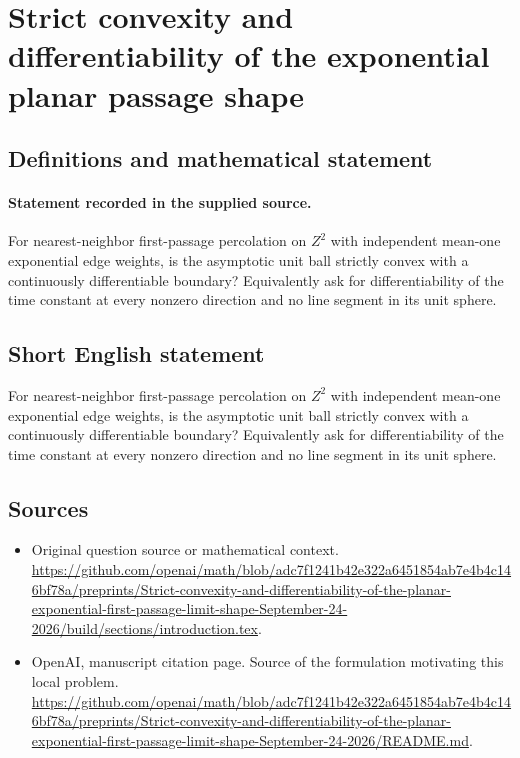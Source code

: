 \documentclass[11pt]{article}
\begin{document}
\section*{Strict convexity and differentiability of the exponential planar passage shape}\label{statement}
\subsection{Definitions and mathematical statement}
\paragraph{Statement recorded in the supplied source.}
For nearest-neighbor first-passage percolation on $Z^2$ with independent mean-one exponential edge weights, is the asymptotic unit ball strictly convex with a continuously differentiable boundary? Equivalently ask for differentiability of the time constant at every nonzero direction and no line segment in its unit sphere.
\subsection{Short English statement}
For nearest-neighbor first-passage percolation on $Z^2$ with independent mean-one exponential edge weights, is the asymptotic unit ball strictly convex with a continuously differentiable boundary? Equivalently ask for differentiability of the time constant at every nonzero direction and no line segment in its unit sphere.
\subsection{Sources}
\begin{itemize}
\item[S1] Original question source or mathematical context.
\url{https://github.com/openai/math/blob/adc7f1241b42e322a6451854ab7e4b4c146bf78a/preprints/Strict-convexity-and-differentiability-of-the-planar-exponential-first-passage-limit-shape-September-24-2026/build/sections/introduction.tex}.
\item[S2] OpenAI, manuscript citation page. Source of the formulation motivating this local problem.
\url{https://github.com/openai/math/blob/adc7f1241b42e322a6451854ab7e4b4c146bf78a/preprints/Strict-convexity-and-differentiability-of-the-planar-exponential-first-passage-limit-shape-September-24-2026/README.md}.
\end{itemize}
\end{document}
